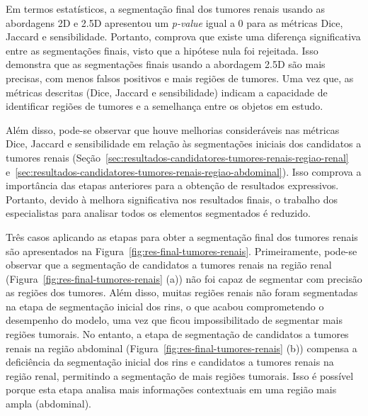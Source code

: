 Em termos estatísticos, a segmentação final dos tumores renais usando as abordagens 2D e 2.5D apresentou um \textit{p-value} igual a 0 para as métricas Dice, Jaccard e sensibilidade. Portanto, comprova que existe uma diferença significativa entre as segmentações finais, visto que a hipótese nula foi rejeitada. Isso demonstra que as segmentações finais usando a abordagem 2.5D são mais precisas, com menos falsos positivos e mais regiões de tumores. Uma vez que, as métricas descritas (Dice, Jaccard e sensibilidade) indicam a capacidade de identificar regiões de tumores e a semelhança entre os objetos em estudo.

Além disso, pode-se observar que houve melhorias consideráveis nas métricas Dice, Jaccard e sensibilidade em relação às segmentações iniciais dos candidatos a tumores renais (Seção~\ref{sec:resultados-candidatores-tumores-renais-regiao-renal} e~\ref{sec:resultados-candidatores-tumores-renais-regiao-abdominal}). Isso comprova a importância das etapas anteriores para a obtenção de resultados expressivos. Portanto, devido à melhora significativa nos resultados finais, o trabalho dos especialistas para analisar todos os elementos segmentados é reduzido.

Três casos aplicando as etapas para obter a segmentação final dos tumores renais são apresentados na Figura~\ref{fig:res-final-tumores-renais}. Primeiramente, pode-se observar que a segmentação de candidatos a tumores renais na região renal (Figura~\ref{fig:res-final-tumores-renais} (a)) não foi capaz de segmentar com precisão as regiões dos tumores. Além disso, muitas regiões renais não foram segmentadas na etapa de segmentação inicial dos rins, o que acabou comprometendo o desempenho do modelo, uma vez que ficou impossibilitado de segmentar mais regiões tumorais. No entanto, a etapa de segmentação de candidatos a tumores renais na região abdominal (Figura~\ref{fig:res-final-tumores-renais} (b)) compensa a deficiência da segmentação inicial dos rins e candidatos a tumores renais na região renal, permitindo a segmentação de mais regiões tumorais. Isso é possível porque esta etapa analisa mais informações contextuais em uma região mais ampla (abdominal). 


